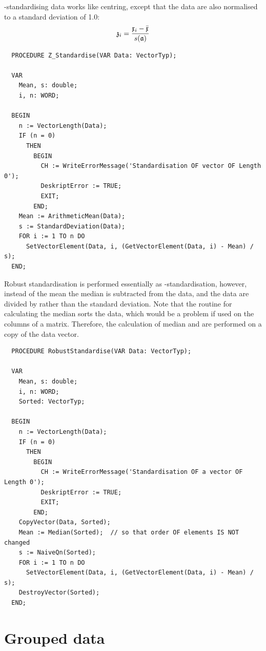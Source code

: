 \begin{refsection}
-standardising data works like centring, except that the data are also normalised to a standard deviation of \num{1.0}:
\begin{equation}
  \mathfrak{z}_{i} = \frac{\mathfrak{x}_{i} - \bar{\mathfrak{x}}}{s(\mathfrak{a})}
\end{equation}

\begin{lstlisting}
  PROCEDURE Z_Standardise(VAR Data: VectorTyp);

  VAR
    Mean, s: double;
    i, n: WORD;

  BEGIN
    n := VectorLength(Data);
    IF (n = 0)
      THEN
        BEGIN
          CH := WriteErrorMessage('Standardisation OF vector OF Length 0');
          DeskriptError := TRUE;
          EXIT;
        END;
    Mean := ArithmeticMean(Data);
    s := StandardDeviation(Data);
    FOR i := 1 TO n DO
      SetVectorElement(Data, i, (GetVectorElement(Data, i) - Mean) / s);
  END;
\end{lstlisting}

Robust standardisation is performed essentially as -standardisation, however, instead of the mean the median is subtracted from the data, and the data are divided by  rather than the standard deviation. Note that the routine for calculating the median sorts the data, which would be a problem if used on the columns of a matrix. Therefore, the calculation of median and  are performed on a copy of the data vector.

\begin{lstlisting}
  PROCEDURE RobustStandardise(VAR Data: VectorTyp);

  VAR
    Mean, s: double;
    i, n: WORD;
    Sorted: VectorTyp;

  BEGIN
    n := VectorLength(Data);
    IF (n = 0)
      THEN
        BEGIN
          CH := WriteErrorMessage('Standardisation OF a vector OF Length 0');
          DeskriptError := TRUE;
          EXIT;
        END;
    CopyVector(Data, Sorted);
    Mean := Median(Sorted);  // so that order OF elements IS NOT changed
    s := NaiveQn(Sorted);
    FOR i := 1 TO n DO
      SetVectorElement(Data, i, (GetVectorElement(Data, i) - Mean) / s);
    DestroyVector(Sorted);
  END;
\end{lstlisting}


\section{Grouped data}


\end{refsection}
